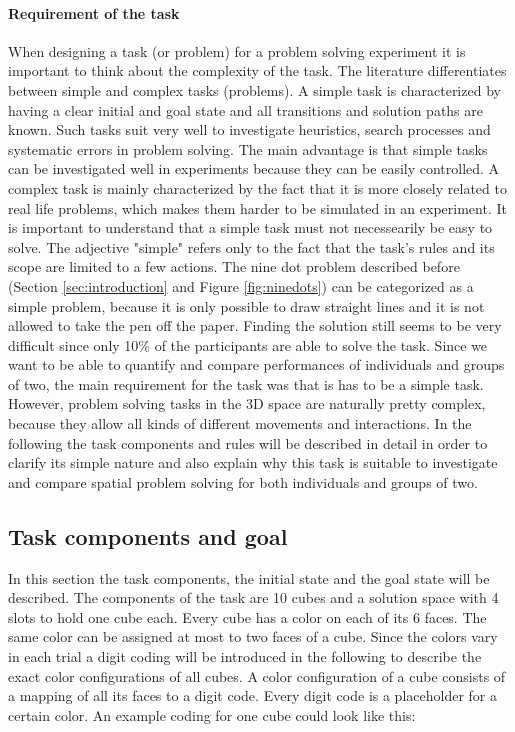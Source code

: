 \documentclass{article}
\begin{document}
\paragraph{Requirement of the task}
When designing a task (or problem) for a problem solving experiment it is important to think about the complexity of the task. The literature differentiates between simple and complex tasks (problems). A simple task is characterized by having a clear initial  and goal state and all transitions and solution paths are known. Such tasks suit very well to investigate heuristics, search processes and systematic errors in problem solving. The main advantage is that simple tasks can be investigated well in experiments because they can be easily controlled. A complex task is mainly characterized by the fact that it is more closely related to real life problems, which makes them harder to be simulated in an experiment. It is important to understand that a simple task must not necessearily be easy to solve. The adjective "simple" refers only to the fact that the task's rules and its scope are limited to a few actions. The nine dot problem described before (Section \ref{sec:introduction} and Figure \ref{fig:ninedots}) can be categorized as a simple problem, because it is only possible to draw straight lines and it is not allowed to take the pen off the paper. Finding the solution still seems to be very difficult since only 10\% of the participants are able to solve the task. \cite{muesseler2015allgemeine} 
Since we want to be able to quantify and compare performances of individuals and groups of two, the main requirement for the task  was that is has to be a simple task. However, problem solving tasks in the 3D space are naturally pretty complex, because they allow all kinds of different movements and interactions. In the following the task components and rules will be described in detail in order to clarify its simple nature and also explain why this task is suitable to investigate and compare spatial problem solving for both individuals and groups of two.

\subsection{Task components and goal}
In this section the task components, the initial state and the goal state will be described.
The components of the task are 10 cubes and a solution space with 4 slots to hold one cube each. Every cube has a color on each of its 6 faces. The same color can be assigned at most to two faces of a cube. Since the colors vary in each trial a digit coding will be introduced in the following to describe the exact color configurations of all cubes. A color configuration of a cube consists of a mapping of all its faces to a digit code. Every digit code is a placeholder for a certain color. An example coding for one cube could look like this: 
\end{document}
